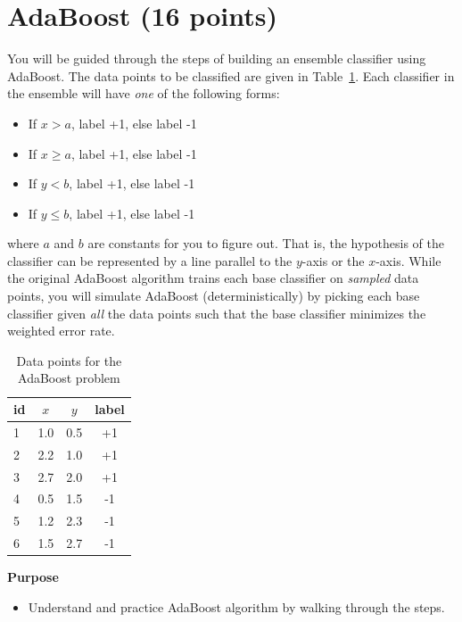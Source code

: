\documentclass[12pt,letterpaper]{article}
\begin{document}
				\section{AdaBoost (16 points)}
				You will be guided through the steps of building an ensemble classifier using AdaBoost. The data points to be classified are given in Table~\ref{tab:ab}. Each classifier in the ensemble will have {\it one} of the following forms:
				\begin{itemize}
					\setlength{\itemsep}{1pt}
					\item If $x>a$, label +1, else label -1
					\item If $x\geq a$, label +1, else label -1
					\item If $y<b$, label +1, else label -1
					\item If $y\leq b$, label +1, else label -1
				\end{itemize}
				where $a$ and $b$ are constants for you to figure out. That is, the hypothesis of the classifier can be represented by a line parallel to the $y$-axis or the $x$-axis. While the original AdaBoost algorithm trains each base classifier on {\it sampled} data points, you will simulate AdaBoost (deterministically) by picking each base classifier given {\it all} the data points such that the base classifier minimizes the weighted error rate.\\
				
				\begin{table}[!h]
					\centering
					\begin{tabular}{l|cc|c}
						\hline
						
						\hline
						\textbf{id} & $x$ & $y$ & {\bf label}\\
						\hline
						1 & 1.0 & 0.5 & +1\\
						2 & 2.2 & 1.0 & +1\\
						3 & 2.7 & 2.0 & +1\\
						4 & 0.5 & 1.5 & -1\\
						5 & 1.2 & 2.3 & -1\\
						6 & 1.5 & 2.7 & -1\\
						\hline
						
						\hline
					\end{tabular}
					\caption{Data points for the AdaBoost problem}    
					\label{tab:ab}    
				\end{table}
				
				\textbf{Purpose} 
				\begin{itemize}
					\item Understand and practice AdaBoost algorithm by walking through the steps.
				\end{itemize}
				
\end{document}

